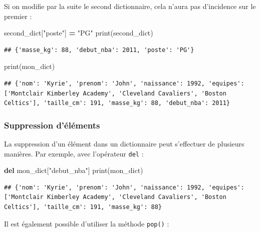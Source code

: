 \documentclass[
  12pt,
]{book}
\newenvironment{Shaded}{\begin{snugshade}}{\end{snugshade}}
\newcommand{\BuiltInTok}[1]{#1}
\newcommand{\KeywordTok}[1]{\textcolor[rgb]{0.13,0.29,0.53}{\textbf{#1}}}
\newcommand{\NormalTok}[1]{#1}
\newcommand{\OperatorTok}[1]{\textcolor[rgb]{0.81,0.36,0.00}{\textbf{#1}}}
\newcommand{\StringTok}[1]{\textcolor[rgb]{0.31,0.60,0.02}{#1}}
\numberwithin{equation}{section}
\numberwithin{countremarque}{section}
\begin{document}
Si on modifie par la suite le second dictionnaire, cela n'aura pas d'incidence sur le premier :

\begin{Shaded}
\begin{Highlighting}[]
\NormalTok{second\_dict[}\StringTok{"poste"}\NormalTok{] }\OperatorTok{=} \StringTok{"PG"}
\BuiltInTok{print}\NormalTok{(second\_dict)}
\end{Highlighting}
\end{Shaded}

\begin{lstlisting}
## {'masse_kg': 88, 'debut_nba': 2011, 'poste': 'PG'}
\end{lstlisting}

\begin{Shaded}
\begin{Highlighting}[]
\BuiltInTok{print}\NormalTok{(mon\_dict)}
\end{Highlighting}
\end{Shaded}

\begin{lstlisting}
## {'nom': 'Kyrie', 'prenom': 'John', 'naissance': 1992, 'equipes': ['Montclair Kimberley Academy', 'Cleveland Cavaliers', 'Boston Celtics'], 'taille_cm': 191, 'masse_kg': 88, 'debut_nba': 2011}
\end{lstlisting}

\subsubsection{Suppression d'éléments}\label{suppression-duxe9luxe9ments-1}

La suppression d'un élément dans un dictionnaire peut s'effectuer de plusieurs manières. Par exemple, avec l'opérateur \texttt{del} :

\begin{Shaded}
\begin{Highlighting}[]
\KeywordTok{del}\NormalTok{ mon\_dict[}\StringTok{"debut\_nba"}\NormalTok{]}
\BuiltInTok{print}\NormalTok{(mon\_dict)}
\end{Highlighting}
\end{Shaded}

\begin{lstlisting}
## {'nom': 'Kyrie', 'prenom': 'John', 'naissance': 1992, 'equipes': ['Montclair Kimberley Academy', 'Cleveland Cavaliers', 'Boston Celtics'], 'taille_cm': 191, 'masse_kg': 88}
\end{lstlisting}

Il est également possible d'utiliser la méthode \texttt{pop()} :
\end{document}
